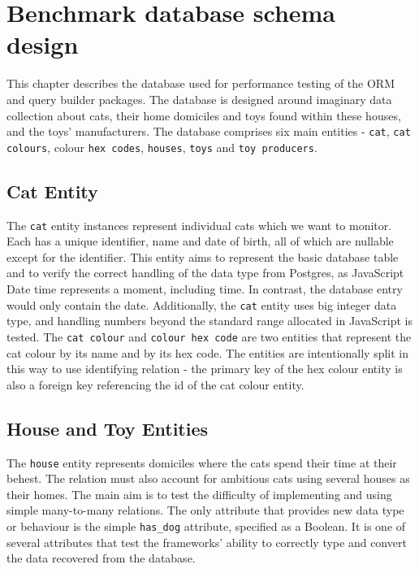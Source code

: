 \chapter{Benchmark database schema design}\label{ch:database}

This chapter describes the database used for performance testing of the ORM and
query builder packages. The database is designed around imaginary data
collection about cats, their home domiciles and toys found within these houses,
and the toys' manufacturers. The database comprises six main entities -
\texttt{cat}, \texttt{cat colours}, colour \texttt{hex codes}, \texttt{houses},
\texttt{toys} and \texttt{toy producers}.

\section{Cat Entity}
The \texttt{cat} entity instances represent individual cats which we want to
monitor. Each has a unique identifier, name and date of birth, all of which are
nullable except for the identifier. This entity aims to represent the basic
database table and to verify the correct handling of the data type from
Postgres, as JavaScript Date time represents a moment, including time. In
contrast, the database entry would only contain the date. Additionally, the
\texttt{cat} entity uses big integer data type, and handling numbers beyond the
standard range allocated in JavaScript is tested. The \texttt{cat colour} and
\texttt{colour hex code} are two entities that represent the cat colour by its
name and by its hex code. The entities are intentionally split in this way to
use identifying relation - the primary key of the hex colour entity is also a
foreign key referencing the id of the cat colour entity.

\section{House and Toy Entities}
The \texttt{house} entity represents domiciles where the cats spend their time
at their behest. The relation must also account for ambitious cats using several
houses as their homes. The main aim is to test the difficulty of implementing
and using simple many-to-many relations. The only attribute that provides new
data type or behaviour is the simple \verb|has_dog| attribute, specified as a
Boolean. It is one of several attributes that test the frameworks' ability to
correctly type and convert the data recovered from the database.

